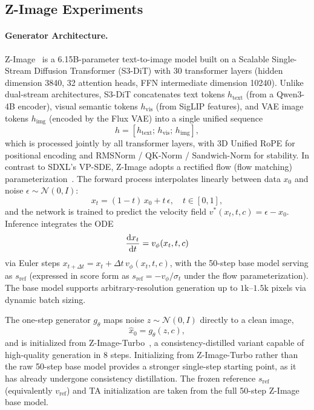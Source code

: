 \subsection{Z-Image Experiments}

\paragraph{Generator Architecture.}
Z-Image~\citep{zimage} is a 6.15B-parameter text-to-image model built on a Scalable Single-Stream Diffusion Transformer (S3-DiT) with 30 transformer layers (hidden dimension 3840, 32 attention heads, FFN intermediate dimension 10240). Unlike dual-stream architectures, S3-DiT concatenates text tokens $h_{\mathrm{text}}$ (from a Qwen3-4B encoder), visual semantic tokens $h_{\mathrm{vis}}$ (from SigLIP features), and VAE image tokens $h_{\mathrm{img}}$ (encoded by the Flux VAE) into a single unified sequence
\begin{equation}
h = [h_{\mathrm{text}};\,h_{\mathrm{vis}};\,h_{\mathrm{img}}],
\end{equation}
which is processed jointly by all transformer layers, with 3D Unified RoPE for positional encoding and RMSNorm / QK-Norm / Sandwich-Norm for stability. In contrast to SDXL's VP-SDE, Z-Image adopts a rectified flow (flow matching) parameterization~\citep{liu2022flow}. The forward process interpolates linearly between data $x_0$ and noise $\epsilon\sim\mathcal{N}(0,I)$:
\begin{equation}
x_t = (1-t)\,x_0 + t\,\epsilon, \quad t\in[0,1],
\end{equation}
and the network is trained to predict the velocity field $v^*(x_t,t,c) = \epsilon - x_0$. Inference integrates the ODE
\begin{equation}
\frac{\mathrm{d} x_t}{\mathrm{d} t} = v_\phi(x_t,t,c)
\end{equation}
via Euler steps $x_{t+\Delta t} = x_t + \Delta t\, v_\phi(x_t,t,c)$, with the 50-step base model serving as $s_{\mathrm{ref}}$ (expressed in score form as $s_{\mathrm{ref}} = -v_\phi/\sigma_t$ under the flow parameterization). The base model supports arbitrary-resolution generation up to $1\text{k}\text{--}1.5\text{k}$ pixels via dynamic batch sizing.

The one-step generator $g_\theta$ maps noise $z\sim\mathcal{N}(0,I)$ directly to a clean image,
\begin{equation}
\hat{x}_0 = g_\theta(z,c),
\end{equation}
and is initialized from Z-Image-Turbo~\citep{zimage}, a consistency-distilled variant capable of high-quality generation in 8 steps. Initializing from Z-Image-Turbo rather than the raw 50-step base model provides a stronger single-step starting point, as it has already undergone consistency distillation. The frozen reference $s_{\mathrm{ref}}$ (equivalently $v_{\mathrm{ref}}$) and TA initialization are taken from the full 50-step Z-Image base model.

